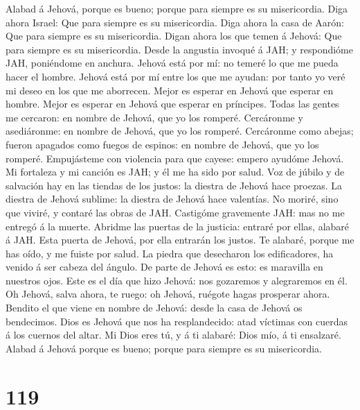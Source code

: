  Alabad á Jehová, porque es bueno; porque para siempre es
su misericordia.  Diga ahora Israel: Que para siempre es
su misericordia.  Diga ahora la casa de Aarón: Que para
siempre es su misericordia.  Digan ahora los que temen á
Jehová: Que para siempre es su misericordia.  Desde la
angustia invoqué á JAH; y respondióme JAH, poniéndome en anchura.
 Jehová está por mí: no temeré lo que me pueda hacer el
hombre.  Jehová está por mí entre los que me ayudan: por
tanto yo veré mi deseo en los que me aborrecen.  Mejor es
esperar en Jehová que esperar en hombre.  Mejor es esperar
en Jehová que esperar en príncipes.  Todas las gentes me
cercaron: en nombre de Jehová, que yo los romperé. 
Cercáronme y asediáronme: en nombre de Jehová, que yo los romperé.
 Cercáronme como abejas; fueron apagados como fuegos de
espinos: en nombre de Jehová, que yo los romperé. 
Empujásteme con violencia para que cayese: empero ayudóme Jehová.
 Mi fortaleza y mi canción es JAH; y él me ha sido por
salud.  Voz de júbilo y de salvación hay en las tiendas
de los justos: la diestra de Jehová hace proezas.  La
diestra de Jehová sublime: la diestra de Jehová hace valentías.
 No moriré, sino que viviré, y contaré las obras de JAH.
 Castigóme gravemente JAH: mas no me entregó á la muerte.
 Abridme las puertas de la justicia: entraré por ellas,
alabaré á JAH.  Esta puerta de Jehová, por ella entrarán
los justos.  Te alabaré, porque me has oído, y me fuiste
por salud.  La piedra que desecharon los edificadores, ha
venido á ser cabeza del ángulo.  De parte de Jehová es
esto: es maravilla en nuestros ojos.  Este es el día que
hizo Jehová: nos gozaremos y alegraremos en él.  Oh
Jehová, salva ahora, te ruego: oh Jehová, ruégote hagas prosperar ahora.
 Bendito el que viene en nombre de Jehová: desde la casa
de Jehová os bendecimos.  Dios es Jehová que nos ha
resplandecido: atad víctimas con cuerdas á los cuernos del altar.
 Mi Dios eres tú, y á ti alabaré: Dios mío, á ti
ensalzaré.  Alabad á Jehová porque es bueno; porque para
siempre es su misericordia.

\hypertarget{section-118}{%
\section{119}\label{section-118}}

